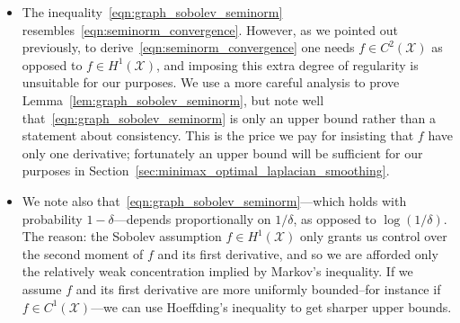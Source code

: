 \documentclass{article}
\newcommand{\1}{\mathbf{1}}
\newcommand{\Xset}{\mathcal{X}}
\theoremstyle{alden}
\theoremstyle{aldenthm}
\theoremstyle{definition}
\theoremstyle{remark}
\begin{document}
\begin{itemize}
	\item 
	The inequality~\eqref{eqn:graph_sobolev_seminorm} resembles~\eqref{eqn:seminorm_convergence}. However, as we pointed out previously, to derive~\eqref{eqn:seminorm_convergence} one needs $f \in C^{2}(\Xset)$ as opposed to $f \in H^1(\Xset)$, and imposing this extra degree of regularity is unsuitable for our purposes. We use a more careful analysis to prove Lemma~\ref{lem:graph_sobolev_seminorm}, but note well that~\eqref{eqn:graph_sobolev_seminorm} is only an upper bound rather than a statement about consistency. This is the price we pay for insisting that $f$ have only one derivative; fortunately an upper bound will be sufficient for our purposes in Section~\ref{sec:minimax_optimal_laplacian_smoothing}.
	\item We note also that~\eqref{eqn:graph_sobolev_seminorm}---which holds with probability $1 - \delta$---depends proportionally on $1/\delta$, as opposed to $\log(1/\delta)$. The reason: the Sobolev assumption $f \in H^1(\Xset)$ only grants us control over the second moment of $f$ and its first derivative, and so we are afforded only the relatively weak concentration implied by Markov's inequality. If we assume $f$ and its first derivative are more uniformly bounded--for instance if $f \in C^1(\Xset)$---we can use Hoeffding's inequality to get sharper upper bounds.
\end{itemize}
 
\end{document}
